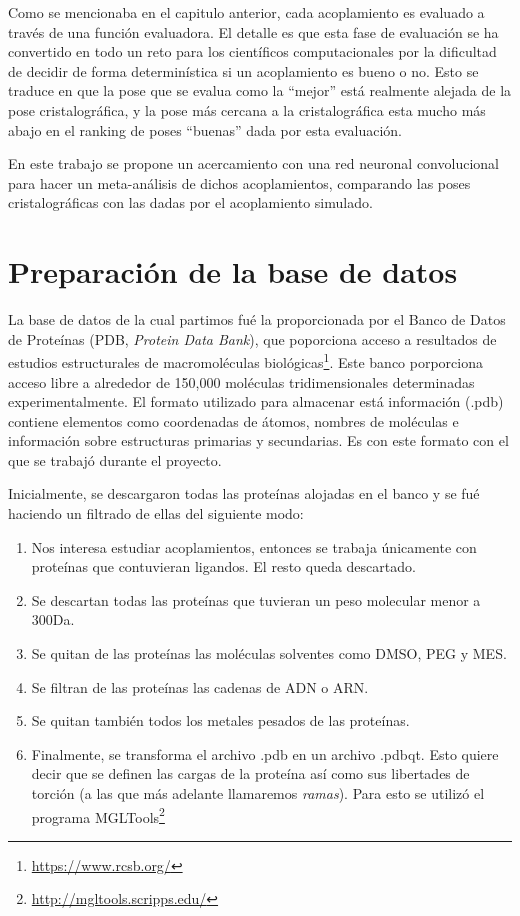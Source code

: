 Como se mencionaba en el capitulo anterior, cada acoplamiento es
evaluado a través de una función evaluadora. El detalle es que esta
fase de evaluación se ha convertido en todo un reto para los
científicos computacionales por la dificultad de decidir de forma
determinística si un acoplamiento es bueno o no. Esto se traduce en
que la pose que se evalua como la ``mejor'' está realmente alejada de
la pose cristalográfica, y la pose más cercana a la cristalográfica
esta mucho más abajo en el ranking de poses ``buenas'' dada por esta
evaluación.

En este trabajo se propone un acercamiento con una red neuronal
convolucional para hacer un meta-análisis de dichos acoplamientos,
comparando las poses cristalográficas con las dadas por el acoplamiento
simulado.

\section{Preparación de la base de datos}
La base de datos de la cual partimos fué la proporcionada por el Banco
de Datos de Proteínas (PDB, \textit{Protein Data Bank}), que
poporciona acceso a resultados de estudios estructurales de
macromoléculas biológicas\footnote{\url{https://www.rcsb.org/}}. Este
banco porporciona acceso libre a alrededor de 150,000 moléculas
tridimensionales determinadas experimentalmente. El formato utilizado
para almacenar está información (.pdb) contiene elementos como coordenadas de
átomos, nombres de moléculas e información sobre estructuras primarias
y secundarias. Es con este formato con el que se trabajó durante el
proyecto.

Inicialmente, se descargaron todas las proteínas alojadas en el banco
y se fué haciendo un filtrado de ellas del siguiente modo:
\begin{enumerate}
  \item Nos interesa estudiar acoplamientos, entonces se trabaja únicamente
  con proteínas que contuvieran ligandos. El resto queda descartado.
  \item Se descartan todas las proteínas que tuvieran un peso
  molecular menor a 300Da.
  \item Se quitan de las proteínas las moléculas solventes
  como DMSO, PEG y MES.\@
  \item Se filtran de las proteínas las cadenas de ADN o ARN.\@
  \item Se quitan también todos los metales pesados de las proteínas.
  \item Finalmente, se transforma el archivo .pdb en un archivo .pdbqt.
  Esto quiere decir que se definen las cargas de la proteína así como
  sus libertades de torción (a las que más adelante
  llamaremos \textit{ramas}). Para esto se utilizó el programa
  MGLTools\footnote{\url{http://mgltools.scripps.edu/}}
\end{enumerate}


